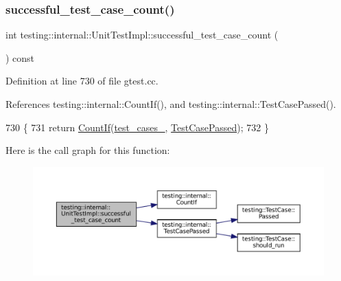 \subsubsection{\texorpdfstring{successful\+\_\+test\+\_\+case\+\_\+count()}{successful\_test\_case\_count()}}
{\footnotesize\ttfamily int testing\+::internal\+::\+Unit\+Test\+Impl\+::successful\+\_\+test\+\_\+case\+\_\+count (\begin{DoxyParamCaption}{ }\end{DoxyParamCaption}) const}



Definition at line 730 of file gtest.\+cc.



References testing\+::internal\+::\+Count\+If(), and testing\+::internal\+::\+Test\+Case\+Passed().


\begin{DoxyCode}
730                                                    \{
731   \textcolor{keywordflow}{return} \hyperlink{namespacetesting_1_1internal_a1e77a774d910346eff11a86d8df783a5}{CountIf}(\hyperlink{classtesting_1_1internal_1_1UnitTestImpl_a79ec0f733ada2898efd1a7fbd8587fb3}{test\_cases\_}, \hyperlink{namespacetesting_1_1internal_aadc7afca7aab40f7f1d41bc17974459a}{TestCasePassed});
732 \}
\end{DoxyCode}
Here is the call graph for this function\+:
\nopagebreak
\begin{figure}[H]
\begin{center}
\leavevmode
\includegraphics[width=350pt]{classtesting_1_1internal_1_1UnitTestImpl_a2db3a2b3fed8065dbdd768ee407bf67e_cgraph}
\end{center}
\end{figure}
\mbox{\label{classtesting_1_1internal_1_1UnitTestImpl_ac363f681cbecf10fea5c04408b98e744}} 
